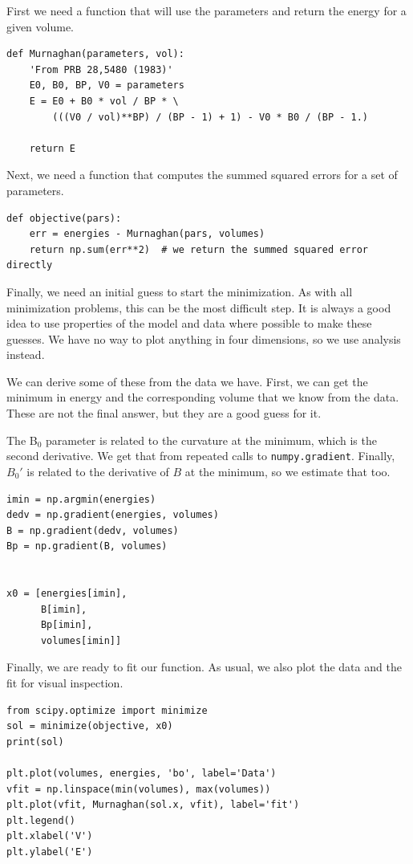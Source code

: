 \documentclass[11pt]{article}
\begin{document}
First we need a function that will use the parameters and return the energy for a given volume.

\begin{verbatim}
def Murnaghan(parameters, vol):
    'From PRB 28,5480 (1983)'
    E0, B0, BP, V0 = parameters
    E = E0 + B0 * vol / BP * \
        (((V0 / vol)**BP) / (BP - 1) + 1) - V0 * B0 / (BP - 1.)

    return E
\end{verbatim}

Next, we need a function that computes the summed squared errors for a set of parameters.

\begin{verbatim}
def objective(pars):
    err = energies - Murnaghan(pars, volumes)
    return np.sum(err**2)  # we return the summed squared error directly
\end{verbatim}

Finally,  we need an initial guess to start the minimization. As with all minimization problems, this can be the most difficult step. It is always a good idea to use properties of the model and data where possible to make these guesses. We have no way to plot anything in four dimensions, so we use analysis instead.

We can derive some of these from the data we have. First, we can get the minimum in energy and the corresponding volume that we know from the data. These are not the final answer, but they are a good guess for it.

The B\(_{\text{0}}\) parameter is related to the curvature at the minimum, which is the second derivative. We get that from repeated calls to \texttt{numpy.gradient}. Finally, \(B_0'\) is related to the derivative of \(B\) at the minimum, so we estimate that too.

\begin{verbatim}
imin = np.argmin(energies)
dedv = np.gradient(energies, volumes)
B = np.gradient(dedv, volumes)
Bp = np.gradient(B, volumes)


x0 = [energies[imin],
      B[imin],
      Bp[imin],
      volumes[imin]]
\end{verbatim}

Finally, we are ready to fit our function. As usual, we also plot the data and the fit for visual inspection.

\begin{verbatim}
from scipy.optimize import minimize
sol = minimize(objective, x0)
print(sol)

plt.plot(volumes, energies, 'bo', label='Data')
vfit = np.linspace(min(volumes), max(volumes))
plt.plot(vfit, Murnaghan(sol.x, vfit), label='fit')
plt.legend()
plt.xlabel('V')
plt.ylabel('E')
\end{verbatim}
\end{document}
